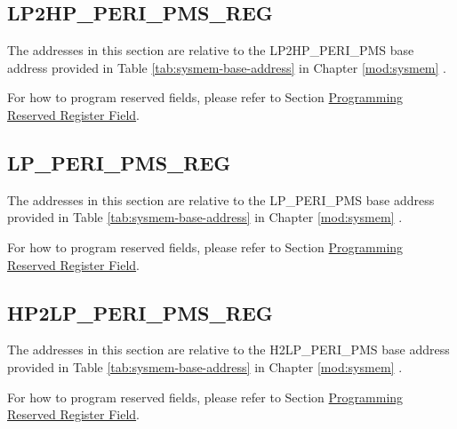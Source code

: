 \documentclass[main\_\_EN.tex]{subfiles}
\begin{document}


\subsection{LP2HP\_PERI\_PMS\_REG}

The addresses in this section are relative to the LP2HP\_PERI\_PMS base address provided in Table \ref{tab:sysmem-base-address} in Chapter \ref{mod:sysmem} \textit{}.

For how to program reserved fields, please refer to Section \hyperref[programming-reserved-field]{Programming Reserved Register Field}.



\subsection{LP\_PERI\_PMS\_REG}

The addresses in this section are relative to the LP\_PERI\_PMS base address provided in Table \ref{tab:sysmem-base-address} in Chapter \ref{mod:sysmem} \textit{}.

For how to program reserved fields, please refer to Section \hyperref[programming-reserved-field]{Programming Reserved Register Field}.



\subsection{HP2LP\_PERI\_PMS\_REG}

The addresses in this section are relative to the H2LP\_PERI\_PMS base address provided in Table \ref{tab:sysmem-base-address} in Chapter \ref{mod:sysmem} \textit{}.

For how to program reserved fields, please refer to Section \hyperref[programming-reserved-field]{Programming Reserved Register Field}.


\end{document}
